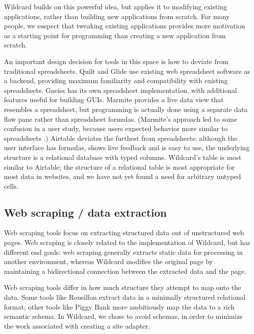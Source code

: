 \documentclass[english,submission]{programming}
\begin{document}
Wildcard builds on this powerful idea, but applies it to modifying
existing applications, rather than building new applications from
scratch. For many people, we suspect that tweaking existing applications
provides more motivation as a starting point for programming than
creating a new application from scratch.

An important design decision for tools in this space is how to deviate
from traditional spreadsheets. Quilt and Glide use existing web
spreadsheet software as a backend, providing maximum familiarity and
compatibility with existing spreadsheets. Gneiss has its own spreadsheet
implementation, with additional features useful for building GUIs.
Marmite provides a live data view that resembles a spreadsheet, but
programming is actually done using a separate data flow pane rather than
spreadsheet formulas. (Marmite's approach led to some confusion in a
user study, because users expected behavior more similar to spreadsheets
\autocite{wong2007}.) Airtable deviates the furthest from spreadsheets:
although the user interface has formulas, shows live feedback and is
easy to use, the underlying structure is a relational database with
typed columns. Wildcard's table is most similar to Airtable; the
structure of a relational table is most appropriate for most data in
websites, and we have not yet found a need for arbitrary untyped cells.

\hypertarget{web-scraping-data-extraction}{%
\subsection{Web scraping / data
extraction}\label{web-scraping-data-extraction}}

Web scraping tools focus on extracting structured data out of
unstructured web pages. Web scraping is closely related to the
implementation of Wildcard, but has different end goals: web scraping
generally extracts static data for processing in another environment,
whereas Wildcard modifies the original page by maintaining a
bidirectional connection between the extracted data and the page.

Web scraping tools differ in how much structure they attempt to map onto
the data. Some tools like Rousillon \autocite{chasins2018} extract data
in a minimally structured relational format; other tools like Piggy Bank
\autocite{huynh2005} more ambitiously map the data to a rich semantic
schema. In Wildcard, we chose to avoid schemas, in order to minimize the
work associated with creating a site adapter.
\end{document}
